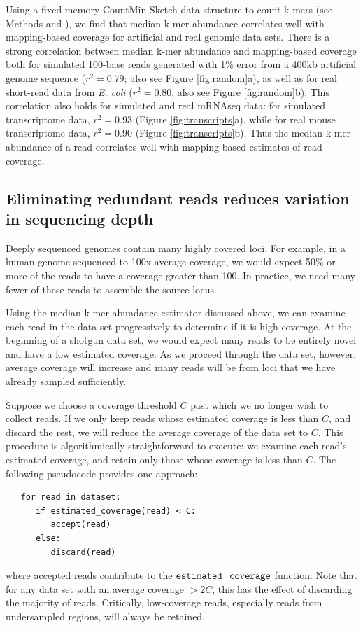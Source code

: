 \documentclass{pnastwo}
\begin{document}
\begin{article}
Using a fixed-memory CountMin Sketch data structure to count k-mers
(see Methods and \cite{countminsketch}), we find that median k-mer
abundance correlates well with mapping-based coverage for artificial
and real genomic data sets.  There is a strong correlation between
median k-mer abundance and mapping-based coverage both for simulated
100-base reads generated with 1\% error from a 400kb artificial genome
sequence ($r^2 = 0.79$; also see Figure \ref{fig:random}a), as well as
for real short-read data from {\em E. coli} ($r^2 = 0.80$, also see
Figure \ref{fig:random}b).  This correlation also holds for simulated
and real mRNAseq data: for simulated transcriptome data, $r^2 = 0.93$
(Figure \ref{fig:transcripts}a), while for real mouse transcriptome
data, $r^2 = 0.90$ (Figure \ref{fig:transcripts}b).
Thus the median k-mer abundance of a read correlates
well with mapping-based estimates of read coverage.


\subsection{Eliminating redundant reads reduces variation in sequencing depth}

Deeply sequenced genomes contain many highly covered loci.  For
example, in a human genome sequenced to 100x average coverage, we would
expect 50\% or more of the reads to have a coverage greater than 100.
In practice, we need many fewer of these reads to assemble
the source locus.

Using the median k-mer abundance estimator discussed above, we can examine each read
in the data set progressively to determine if it is high coverage.  At
the beginning of a shotgun data set, we would expect many reads to be
entirely novel and have a low estimated coverage.  As we proceed
through the data set, however, average coverage will increase and many
reads will be from loci that we have already sampled sufficiently.

Suppose we choose a coverage threshold $C$ past which we no longer
wish to collect reads. If we only keep reads whose estimated coverage
is less than $C$, and discard the rest, we will reduce the average
coverage of the data set to $C$.  This procedure is
algorithmically straightforward to execute: we examine each read's
estimated coverage, and retain only those whose coverage is less than $C$.
The following pseudocode provides one approach:
\begin{verbatim}
   for read in dataset:
      if estimated_coverage(read) < C:
         accept(read)
      else:
         discard(read)
\end{verbatim}
\noindent
where accepted reads contribute to the $\tt estimated\_coverage$
function.  Note that for any data set with an average coverage $> 2C$,
this has the effect of discarding the majority of reads.  Critically,
low-coverage reads, especially reads from undersampled regions, will
always be retained.


\end{article}
\end{document}
